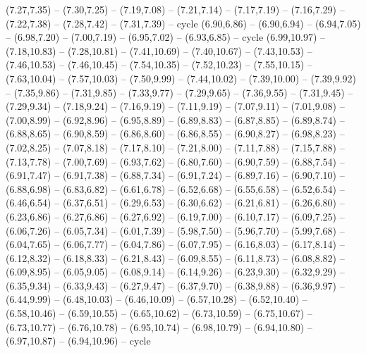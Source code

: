 \expandafter\def\csname geo:gebiet:SWE\endcsname{
  (7.27,7.35) -- (7.30,7.25) -- (7.19,7.08) -- (7.21,7.14) -- (7.17,7.19) -- (7.16,7.29) -- (7.22,7.38) -- (7.28,7.42) -- (7.31,7.39) -- cycle
  (6.90,6.86) -- (6.90,6.94) -- (6.94,7.05) -- (6.98,7.20) -- (7.00,7.19) -- (6.95,7.02) -- (6.93,6.85) -- cycle
  (6.99,10.97) -- (7.18,10.83) -- (7.28,10.81) -- (7.41,10.69) -- (7.40,10.67) -- (7.43,10.53) -- (7.46,10.53) -- (7.46,10.45) -- (7.54,10.35) -- (7.52,10.23) -- (7.55,10.15) -- (7.63,10.04) -- (7.57,10.03) -- (7.50,9.99) -- (7.44,10.02) -- (7.39,10.00) -- (7.39,9.92) -- (7.35,9.86) -- (7.31,9.85) -- (7.33,9.77) -- (7.29,9.65) -- (7.36,9.55) -- (7.31,9.45) -- (7.29,9.34) -- (7.18,9.24) -- (7.16,9.19) -- (7.11,9.19) -- (7.07,9.11) -- (7.01,9.08) -- (7.00,8.99) -- (6.92,8.96) -- (6.95,8.89) -- (6.89,8.83) -- (6.87,8.85) -- (6.89,8.74) -- (6.88,8.65) -- (6.90,8.59) -- (6.86,8.60) -- (6.86,8.55) -- (6.90,8.27) -- (6.98,8.23) -- (7.02,8.25) -- (7.07,8.18) -- (7.17,8.10) -- (7.21,8.00) -- (7.11,7.88) -- (7.15,7.88) -- (7.13,7.78) -- (7.00,7.69) -- (6.93,7.62) -- (6.80,7.60) -- (6.90,7.59) -- (6.88,7.54) -- (6.91,7.47) -- (6.91,7.38) -- (6.88,7.34) -- (6.91,7.24) -- (6.89,7.16) -- (6.90,7.10) -- (6.88,6.98) -- (6.83,6.82) -- (6.61,6.78) -- (6.52,6.68) -- (6.55,6.58) -- (6.52,6.54) -- (6.46,6.54) -- (6.37,6.51) -- (6.29,6.53) -- (6.30,6.62) -- (6.21,6.81) -- (6.26,6.80) -- (6.23,6.86) -- (6.27,6.86) -- (6.27,6.92) -- (6.19,7.00) -- (6.10,7.17) -- (6.09,7.25) -- (6.06,7.26) -- (6.05,7.34) -- (6.01,7.39) -- (5.98,7.50) -- (5.96,7.70) -- (5.99,7.68) -- (6.04,7.65) -- (6.06,7.77) -- (6.04,7.86) -- (6.07,7.95) -- (6.16,8.03) -- (6.17,8.14) -- (6.12,8.32) -- (6.18,8.33) -- (6.21,8.43) -- (6.09,8.55) -- (6.11,8.73) -- (6.08,8.82) -- (6.09,8.95) -- (6.05,9.05) -- (6.08,9.14) -- (6.14,9.26) -- (6.23,9.30) -- (6.32,9.29) -- (6.35,9.34) -- (6.33,9.43) -- (6.27,9.47) -- (6.37,9.70) -- (6.38,9.88) -- (6.36,9.97) -- (6.44,9.99) -- (6.48,10.03) -- (6.46,10.09) -- (6.57,10.28) -- (6.52,10.40) -- (6.58,10.46) -- (6.59,10.55) -- (6.65,10.62) -- (6.73,10.59) -- (6.75,10.67) -- (6.73,10.77) -- (6.76,10.78) -- (6.95,10.74) -- (6.98,10.79) -- (6.94,10.80) -- (6.97,10.87) -- (6.94,10.96) -- cycle}
